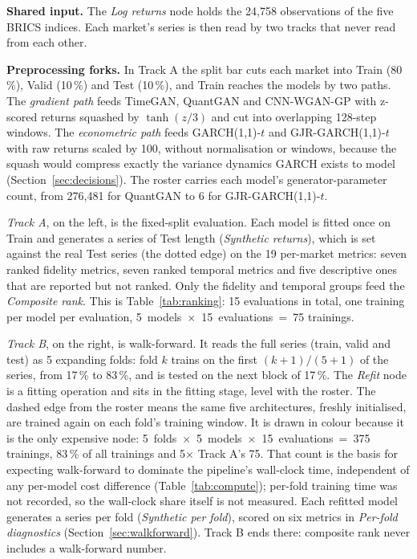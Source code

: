 \documentclass[11pt,a4paper]{article}
\makeatletter
\DeclareRobustCommand{\_}{\ifmmode\nfss@text{\textunderscore}\else\textunderscore\allowbreak\fi}
\makeatother
\begin{document}
\textbf{Shared input.} The \emph{Log returns} node holds the 24,758 observations of the five BRICS indices. Each market's series is then read by two tracks that never read from each other.

\textbf{Preprocessing forks.} In Track A the split bar cuts each market into Train (80\,\%), Valid (10\,\%) and Test (10\,\%), and Train reaches the models by two paths. The \emph{gradient path} feeds TimeGAN, QuantGAN and CNN-WGAN-GP with z-scored returns squashed by $\tanh(z/3)$ and cut into overlapping 128-step windows. The \emph{econometric path} feeds GARCH(1,1)-$t$ and GJR-GARCH(1,1)-$t$ with raw returns scaled by 100, without normalisation or windows, because the squash would compress exactly the variance dynamics GARCH exists to model (Section~\ref{sec:decisions}). The roster carries each model's generator-parameter count, from 276,481 for QuantGAN to 6 for GJR-GARCH(1,1)-$t$.

\emph{Track A}, on the left, is the fixed-split evaluation. Each model is fitted once on Train and generates a series of Test length (\emph{Synthetic returns}), which is set against the real Test series (the dotted edge) on the 19 per-market metrics: seven ranked fidelity metrics, seven ranked temporal metrics and five descriptive ones that are reported but not ranked. Only the fidelity and temporal groups feed the \emph{Composite rank}. This is Table~\ref{tab:ranking}: 15 evaluations in total, one training per model per evaluation, 5~models~$\times$~15~evaluations~=~75 trainings.

\emph{Track B}, on the right, is walk-forward. It reads the full series (train, valid and test) as 5 expanding folds: fold $k$ trains on the first $(k+1)/(5+1)$ of the series, from 17\,\% to 83\,\%, and is tested on the next block of 17\,\%. The \emph{Refit} node is a fitting operation and sits in the fitting stage, level with the roster. The dashed edge from the roster means the same five architectures, freshly initialised, are trained again on each fold's training window. It is drawn in colour because it is the only expensive node: 5~folds~$\times$~5~models~$\times$~15~evaluations~=~375 trainings, 83\,\% of all trainings and 5$\times$ Track A's 75. That count is the basis for expecting walk-forward to dominate the pipeline's wall-clock time, independent of any per-model cost difference (Table~\ref{tab:compute}); per-fold training time was not recorded, so the wall-clock share itself is not measured. Each refitted model generates a series per fold (\emph{Synthetic per fold}), scored on six metrics in \emph{Per-fold diagnostics} (Section~\ref{sec:walkforward}). Track B ends there: composite rank never includes a walk-forward number.
\end{document}
